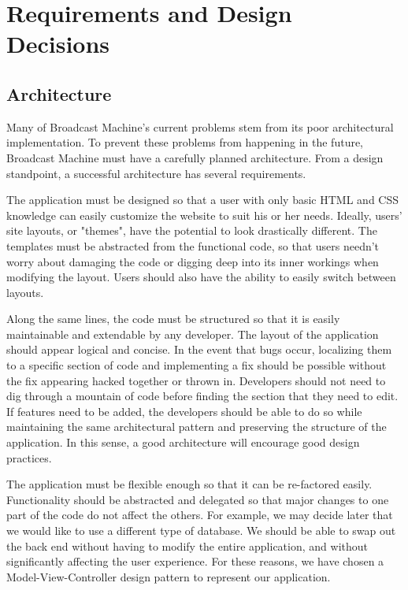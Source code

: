 \documentclass[a4paper,12pt]{report}
\begin{document}
\chapter{Requirements and Design Decisions}

\section{Architecture}

    Many of Broadcast Machine's current problems stem from its poor architectural implementation.
To prevent these problems from happening in the future, Broadcast Machine must have a carefully planned architecture.
From a design standpoint, a successful architecture has several requirements. 

The application must be designed so that a user with only basic HTML and CSS knowledge can easily customize the website to suit his or her needs.
Ideally, users' site layouts, or "themes", have the potential to look drastically different.
The templates must be abstracted from the functional code, so that users needn't worry about damaging the code or digging deep into its inner workings when modifying the layout.
Users should also have the ability to easily switch between layouts.

Along the same lines, the code must be structured so that it is easily maintainable and extendable by any developer.
The layout of the application should appear logical and concise.
In the event that bugs occur, localizing them to a specific section of code and implementing a fix should be possible without the fix appearing hacked together or thrown in.
Developers should not need to dig through a mountain of code before finding the section that they need to edit.
If features need to be added, the developers should be able to do so while maintaining the same architectural pattern and preserving the structure of the application.
In this sense, a good architecture will encourage good design practices. 

The application must be flexible enough so that it can be re-factored easily.
Functionality should be abstracted and delegated so that major changes to one part of the code do not affect the others.
For example, we may decide later that we would like to use a different type of database.
We should be able to swap out the back end without having to modify the entire application, and without significantly affecting the user experience.
For these reasons, we have chosen a Model-View-Controller design pattern to represent our application.
\end{document}
